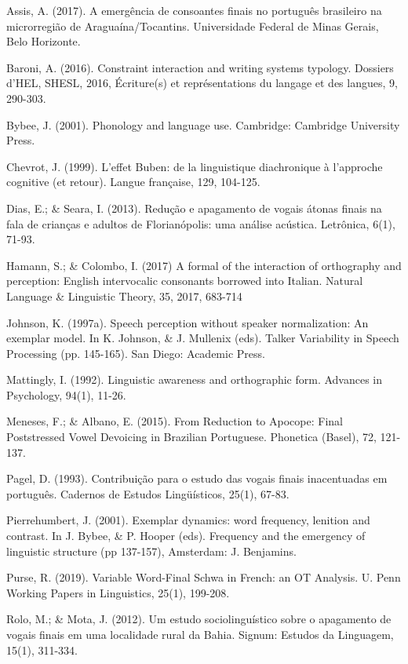 \vspace{1ex}

Assis, A. (2017). A emergência de consoantes finais no português brasileiro na microrregião de Araguaína/Tocantins. Universidade Federal de Minas Gerais, Belo Horizonte.

Baroni, A. (2016). Constraint interaction and writing systems typology. Dossiers d’HEL, SHESL, 2016, Écriture(s) et représentations du langage et des langues, 9, 290-303.

Bybee, J. (2001). Phonology and language use. Cambridge: Cambridge University Press.

Chevrot, J. (1999). L’effet Buben: de la linguistique diachronique à l’approche cognitive (et retour). Langue française, 129, 104-125.

Dias, E.; \& Seara, I. (2013). Redução e apagamento de vogais átonas finais na fala de crianças e adultos de Florianópolis: uma análise acústica. Letrônica, 6(1), 71-93.

Hamann, S.; \& Colombo, I. (2017) A formal of the interaction of orthography and perception: English intervocalic consonants borrowed into Italian. Natural Language \& Linguistic Theory, 35, 2017, 683-714

Johnson, K. (1997a). Speech perception without speaker normalization: An exemplar model. In K. Johnson, \& J. Mullenix (eds). Talker Variability in Speech Processing (pp. 145-165). San Diego: Academic Press.

Mattingly, I. (1992). Linguistic awareness and orthographic form. Advances in Psychology, 94(1), 11-26.

Meneses, F.; \& Albano, E. (2015). From Reduction to Apocope: Final Poststressed Vowel Devoicing in Brazilian Portuguese. Phonetica (Basel), 72, 121-137.

Pagel, D. (1993). Contribuição para o estudo das vogais finais inacentuadas em português. Cadernos de Estudos Lingüísticos, 25(1), 67-83.

Pierrehumbert, J. (2001). Exemplar dynamics: word frequency, lenition and contrast. In J. Bybee, \& P. Hooper (eds). Frequency and the emergency of linguistic structure (pp 137-157), Amsterdam: J. Benjamins.

Purse, R. (2019). Variable Word-Final Schwa in French: an OT Analysis. U. Penn Working Papers in Linguistics, 25(1), 199-208.

Rolo, M.; \& Mota, J. (2012). Um estudo sociolinguístico sobre o apagamento de vogais finais em uma localidade rural da Bahia. Signum: Estudos da Linguagem, 15(1), 311-334.

